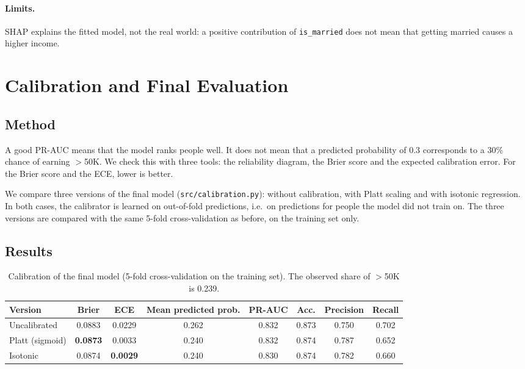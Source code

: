 \documentclass[10pt,a4paper]{article}
\newcommand{\high}{$>$50K}
\begin{document}
\paragraph{Limits.}
SHAP explains the fitted model, not the real world: a positive contribution of
\texttt{is\_married} does not mean that getting married causes a higher income.

\section{Calibration and Final Evaluation}
\label{sec:calibration}

\subsection{Method}
A good PR-AUC means that the model ranks people well. It does not mean that a predicted
probability of 0.3 corresponds to a 30\% chance of earning \high{}. We check this with
three tools: the reliability diagram, the Brier score and the expected calibration error. 
For the Brier score and the ECE, lower is better.

We compare three versions of the final model (\texttt{src/calibration.py}): without
calibration, with Platt scaling and with isotonic regression. In both cases, the calibrator is
learned on out-of-fold predictions, i.e.\ on predictions for people the model did not
train on. The three versions are compared with the same 5-fold cross-validation as
before, on the training set only.

\subsection{Results}

\begin{table}[htbp]
\centering
\caption{Calibration of the final model (5-fold cross-validation on the training set).
The observed share of \high{} is 0.239.}
\label{tab:calibration}
\small
\setlength{\tabcolsep}{4pt}
\begin{tabular}{lccccccc}
\toprule
Version & Brier & ECE & Mean predicted prob. & PR-AUC & Acc. & Precision & Recall \\
\midrule
Uncalibrated    & 0.0883 & 0.0229 & 0.262 & 0.832 & 0.873 & 0.750 & 0.702 \\
Platt (sigmoid) & \textbf{0.0873} & 0.0033 & 0.240 & 0.832 & 0.874 & 0.787 & 0.652 \\
Isotonic        & 0.0874 & \textbf{0.0029} & 0.240 & 0.830 & 0.874 & 0.782 & 0.660 \\
\bottomrule
\end{tabular}
\end{table}
\end{document}
